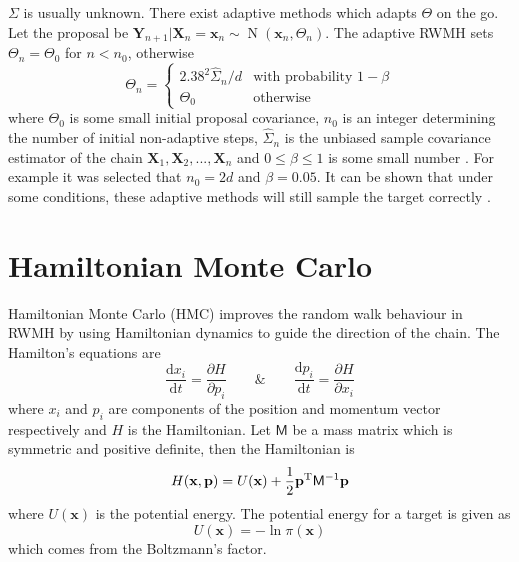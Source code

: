 \documentclass[10pt]{proc}
\DeclareMathOperator{\normal}{N}
\newcommand{\diff}{\mathrm{d}}
\newcommand{\T}{^\textup{T}}
\newcommand{\dotdotdot}{...}
\newcommand{\vect}[1]{\mathbf{#1}}
\newcommand{\matr}[1]{\mathsf{#1}}
\begin{document}
$\matr{\Sigma}$ is usually unknown. There exist adaptive methods \citep{haario2001adaptive} \citep{roberts2009examples} which adapts $\matr{\Theta}$ on the go. Let the proposal be $\vect{Y}_{n+1}|\vect{X}_n=\vect{x}_n\sim \normal\left(\vect{x}_n,\matr{\Theta}_n\right)$. The adaptive RWMH sets $\matr{\Theta}_{n}=\matr{\Theta}_0$ for $n<n_0$, otherwise
\begin{equation}
\matr{\Theta}_{n} =
\begin{cases}
2.38^2 \widehat{\matr{\Sigma}}_n/d & \text{with probability }1-\beta \\
\matr{\Theta}_0 & \text{otherwise}
\end{cases}
\end{equation}
where $\matr{\Theta}_0$ is some small initial proposal covariance, $n_0$ is an integer determining the number of initial non-adaptive steps, $\widehat{\matr{\Sigma}}_n$ is the unbiased sample covariance estimator of the chain $\vect{X}_1,\vect{X}_2,\dotdotdot,\vect{X}_n$ and $0\leqslant\beta\leqslant 1$ is some small number \citep{roberts2009examples}. For example it was selected that $n_0= 2d$ and $\beta = 0.05$. It can be shown that under some conditions, these adaptive methods will still sample the target correctly \citep{rosenthal2007coupling}.

\section{Hamiltonian Monte Carlo}
Hamiltonian Monte Carlo (HMC) \citep{neal2011mcmc} improves the random walk behaviour in RWMH by using Hamiltonian dynamics to guide the direction of the chain. The Hamilton's equations are
\begin{equation}
\dfrac{\diff x_i}{\diff t}=\dfrac{\partial H}{\partial p_i}
\qquad\&\qquad
\dfrac{\diff p_i}{\diff t}=\dfrac{\partial H}{\partial x_i}
\end{equation}
where $x_i$ and $p_i$ are components of the position and momentum vector respectively and $H$ is the Hamiltonian. Let $\matr{M}$ be a mass matrix which is symmetric and positive definite, then the Hamiltonian is
\begin{equation}
H(\vect{x},\vect{p})=U(\vect{x}) + \dfrac{1}{2}\vect{p}\T\matr{M}^{-1}\vect{p}
\end{equation}
where $U(\vect{x})$ is the potential energy. The potential energy for a target is given as
\begin{equation}
U(\vect{x}) = -\ln\pi(\vect{x})
\end{equation}
which comes from the Boltzmann's factor.
\end{document}
